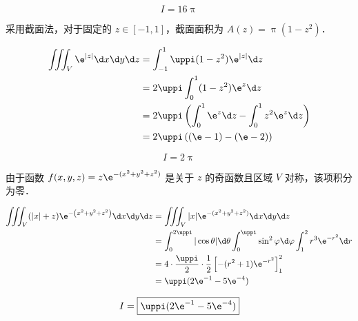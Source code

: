 \begin{solution}
    \begin{equation}
        I = \boxed{16 \uppi}
    \end{equation}

    采用截面法，对于固定的 $z \in [-1, 1]$，截面面积为 $A(z) = \uppi(1-z^2)$．

    \begin{equation}
        \begin{aligned}
            \iiint_{V} \e^{|z|} \d x \d y \d z & = \int_{-1}^{1} \uppi (1-z^2) \e^{|z|} \d z                                  \\
                                               & = 2 \uppi \int_{0}^{1} (1-z^2) \e^z \d z                                     \\
                                               & = 2 \uppi \left( \int_{0}^{1} \e^z \d z - \int_{0}^{1} z^2 \e^z \d z \right) \\
                                               & = 2 \uppi \left( (\e - 1) - (\e - 2) \right) \label{eq:I7}
        \end{aligned}
    \end{equation}

    \begin{equation}
        I = \boxed{2 \uppi}
    \end{equation}

    由于函数 $f(x, y, z) = z \e^{-(x^2+y^2+z^2)}$ 是关于 $z$ 的奇函数且区域 $V$ 对称，该项积分为零．

    \begin{equation}
        \begin{aligned}
            \iiint_{V}(|x|+z) \e^{-\left(x^{2}+y^{2}+z^{2}\right)} \d x \d y \d z & = \iiint_{V} |x| \e^{-(x^2+y^2+z^2)} \d x \d y \d z                                                                     \\
                                                                                  & = \int_{0}^{2 \uppi} |\cos \theta| \d \theta \int_{0}^{\uppi} \sin^2 \varphi \d \varphi \int_{1}^{2} r^3 \e^{-r^2} \d r \\
                                                                                  & = 4 \cdot \frac{\uppi}{2} \cdot \frac{1}{2} \left[ -(r^2+1) \e^{-r^2} \right]_{1}^{2}                                   \\
                                                                                  & = \uppi (2 \e^{-1} - 5 \e^{-4}) \label{eq:I8}
        \end{aligned}
    \end{equation}

    \begin{equation}
        I = \boxed{\uppi(2 \e^{-1} - 5 \e^{-4})}
    \end{equation}
\end{solution}

